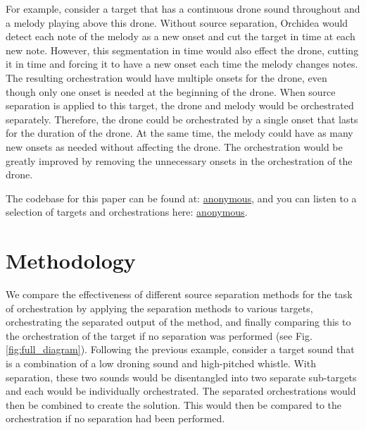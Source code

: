 \documentclass[letterpaper]{article}  %
\begin{document}

  For example, consider a target that has a continuous drone sound throughout and a melody playing above this drone. Without source separation, Orchidea would detect each note of the melody as a new onset and cut the target in time at each new note. However, this segmentation in time would also effect the drone, cutting it in time and forcing it to have a new onset each time the melody changes notes. The resulting orchestration would have multiple onsets for the drone, even though only one onset is needed at the beginning of the drone. When source separation is applied to this target, the drone and melody would be orchestrated separately. Therefore, the drone could be orchestrated by a single onset that lasts for the duration of the drone. At the same time, the melody could have as many new onsets as needed without affecting the drone. The orchestration would be greatly improved by removing the unnecessary onsets in the orchestration of the drone.

  The codebase for this paper can be found at: \url{anonymous}, and you can listen to a selection of targets and orchestrations here: \url{anonymous}.


  \section{Methodology}\label{sec:methodology}

  We compare the effectiveness of different source separation methods for the task of orchestration by applying the separation methods to various targets, orchestrating the separated output of the method, and finally comparing this to the orchestration of the target if no separation was performed (see Fig. \ref{fig:full_diagram}). Following the previous example, consider a target sound that is a combination of a low droning sound and high-pitched whistle. With separation, these two sounds would be disentangled into two separate sub-targets and each would be individually orchestrated. The separated orchestrations would then be combined to create the solution. This would then be compared to the orchestration if no separation had been performed.
\end{document}
